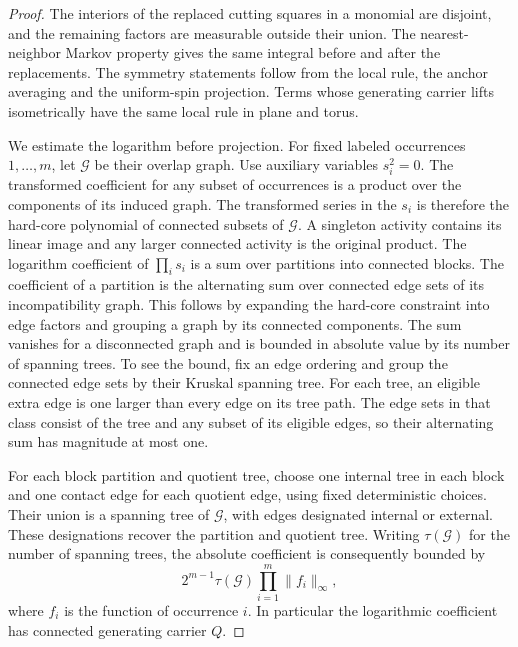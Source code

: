 \documentclass[11pt]{article}
\theoremstyle{definition}
\begin{document}
\begin{proof}
The interiors of the replaced cutting squares in a monomial
are disjoint, and the remaining factors are measurable outside
their union. The nearest-neighbor Markov property gives the
same integral before and after the replacements. The symmetry
statements follow from the local rule, the anchor averaging
and the uniform-spin projection. Terms whose generating carrier
lifts isometrically have the same local rule in plane and torus.

We estimate the logarithm before projection. For fixed labeled
occurrences \(1,\dots,m\), let \(\mathcal G\) be their overlap
graph. Use auxiliary variables \(s_i^2=0\). The transformed
coefficient for any subset of occurrences is a product over
the components of its induced graph. The transformed series in
the \(s_i\) is therefore the hard-core polynomial of connected
subsets of \(\mathcal G\). A singleton activity contains its
linear image and any larger connected activity is the original
product. The logarithm coefficient of \(\prod_i s_i\) is a
sum over partitions into connected blocks. The coefficient of
a partition is the alternating sum over connected edge sets of
its incompatibility graph. This follows by expanding the
hard-core constraint into edge factors and grouping a graph
by its connected components. The sum vanishes for a disconnected
graph and is bounded in absolute value by its number of
spanning trees. To see the bound, fix an edge ordering and
group the connected edge sets by their Kruskal spanning tree.
For each tree, an eligible extra edge is one larger than every
edge on its tree path. The edge sets in that class consist of
the tree and any subset of its eligible edges, so their
alternating sum has magnitude at most one.

For each block partition and quotient tree, choose one internal
tree in each block and one contact edge for each quotient edge,
using fixed deterministic choices. Their union is a spanning
tree of \(\mathcal G\), with edges designated internal or
external. These designations recover the partition and quotient
tree. Writing \(\tau(\mathcal G)\) for the number of spanning
trees, the absolute coefficient is consequently bounded by
\[
 2^{m-1}\tau(\mathcal G)\prod_{i=1}^m\|f_i\|_\infty ,
\]
where \(f_i\) is the function of occurrence \(i\).
In particular the logarithmic coefficient has connected
generating carrier \(Q\).


\end{proof}
\end{document}
